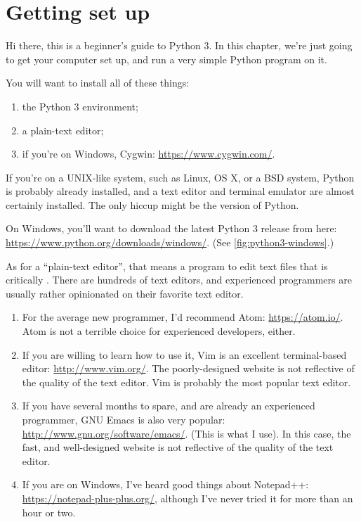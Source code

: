 \chapter{Getting set up}

Hi there, this is a beginner's guide to Python 3. In this chapter,
we're just going to get your computer set up, and run a very simple
Python program on it.

You will want to install all of these things:

\begin{enumerate}
\item the Python 3 environment;
\item a plain-text editor;
\item if you're on Windows, Cygwin: \url{https://www.cygwin.com/}.
\end{enumerate}

If you're on a UNIX-like system, such as Linux, OS X, or a BSD system,
Python is probably already installed, and a text editor and terminal
emulator are almost certainly installed. The only hiccup might be the
version of Python.

On Windows, you'll want to download the latest Python 3 release from
here: \url{https://www.python.org/downloads/windows/}. (See
\cref{fig:python3-windows}.)

As for a ``plain-text editor'', that means a program to edit text
files that is critically . There are
hundreds of text editors, and experienced programmers are usually
rather opinionated on their favorite text editor.

\begin{enumerate}
\item For the average new programmer, I'd recommend Atom:
  \url{https://atom.io/}. Atom is not a terrible choice for
  experienced developers, either.
\item If you are willing to learn how to use it, Vim is an excellent
  terminal-based editor: \url{http://www.vim.org/}. The
  poorly-designed website is not reflective of the quality of the text
  editor. Vim is probably the most popular text editor.
\item If you have several months to spare, and are already an
  experienced programmer, GNU Emacs is also very popular:
  \url{http://www.gnu.org/software/emacs/}. (This is what I use). In
  this case, the fast, and well-designed website is not reflective of
  the quality of the text editor.
\item If you are on Windows, I've heard good things about Notepad++:
  \url{https://notepad-plus-plus.org/}, although I've never tried it
  for more than an hour or two.
\end{enumerate}

